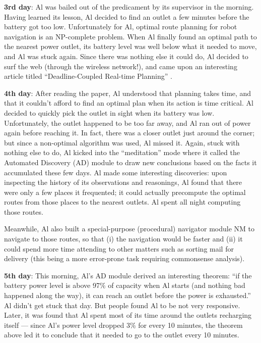 \documentclass[]{llncs}
\begin{document}
\noindent \textbf{3rd day}: Al was bailed out of the predicament by
its supervisor in the morning.  Having learned its lesson, Al decided to
find an outlet a few minutes before the battery got too low.  Unfortunately
for Al, optimal route planning for robot navigation is an NP-complete
problem.  When Al finally found an optimal path to the nearest power
outlet, its battery level was well below what it needed to move, and Al was
stuck again.  Since there was nothing else it could do, Al decided to surf
the web (through the wireless network!), and came upon an interesting
article titled {}``Deadline-Coupled Real-time Planning''
\cite{nirkhe/kraus/miller/perlis:how}.

\noindent \textbf{4th day}: After reading the paper, Al understood
that planning takes time, and that it couldn't afford to find an optimal
plan when its action is time critical.  Al decided to quickly pick the
outlet in sight when its battery was low.  Unfortunately, the outlet
happened to be too far away, and Al ran out of power again before reaching
it.  In fact, there was a closer outlet just around the corner; but since a
non-optimal algorithm was used, Al missed it.  Again, stuck with nothing
else to do, Al kicked into the {}``meditation'' mode where it called the
Automated Discovery (AD) module to draw new conclusions based on the facts
it accumulated these few days.  Al made some interesting discoveries: upon
inspecting the history of its observations and reasonings, Al found that
there were only a few places it frequented; it could actually precompute
the optimal routes from those places to the nearest outlets.  Al spent all
night computing those routes.

Meanwhile, Al also built a special-purpose (procedural) navigator module NM
to navigate to those routes, so that (i) the navigation would be faster and
(ii) it could spend more time attending to other matters such as sorting
mail for delivery (this being a more error-prone task requiring commonsense
analysis).

\noindent \textbf{5th day}: This morning, Al's AD module derived an
interesting theorem: {}``if the battery power level is above 97\% of
capacity when Al starts (and nothing bad happened along the way), it can
reach an outlet before the power is exhausted.'' Al didn't get stuck that
day.  But people found Al to be not very responsive.  Later, it was found
that Al spent most of its time around the outlets recharging itself ---
since Al's power level dropped 3\% for every 10 minutes, the theorem above
led it to conclude that it needed to go to the outlet every 10 minutes.
\end{document}
